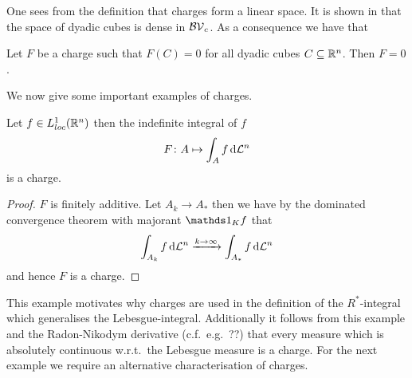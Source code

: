 \noindent One sees from the definition that charges form a linear space.
It is shown in \cite[Corollary 1.10.4]{Pfe2001} that the space of dyadic cubes is dense in $\mathcal{BV}_c$. As a consequence we have that

\begin{lemma}\label{le:DensityCubes}
Let $F$ be a charge such that $F(C)=0$ for all dyadic cubes $C\subseteq\mathbb{R}^n$. Then $F=0$.
\end{lemma}

We now give some important examples of charges.

\begin{claim}
Let $f\in L^1_{loc}(\mathbb{R}^n)$ then the indefinite integral of $f$
\begin{align*}
	F\colon A\mapsto \int_Af\,\mathrm{d} \mathcal{L}^n
\end{align*}
is a charge.
\end{claim}
\begin{proof}
$F$ is finitely additive. Let $A_k\to A_*$ then we have by the dominated convergence theorem with majorant $\one_Kf$ that
\begin{align*}
	\int_{A_k}f\,\mathrm{d} \mathcal{L}^n\xrightarrow{k\to\infty}\int_{A_*}f\,\mathrm{d} \mathcal{L}^n
\end{align*}
and hence $F$ is a charge.
\end{proof}

\noindent This example motivates why charges are used in the definition of the $R^*$-integral which generalises the Lebesgue-integral. Additionally it follows from this example and the Radon-Nikodym derivative (c.f.\ e.g.\ ??) that every measure which is absolutely continuous w.r.t.\ the Lebesgue measure is a charge. For the next example we require an alternative characterisation of charges.

